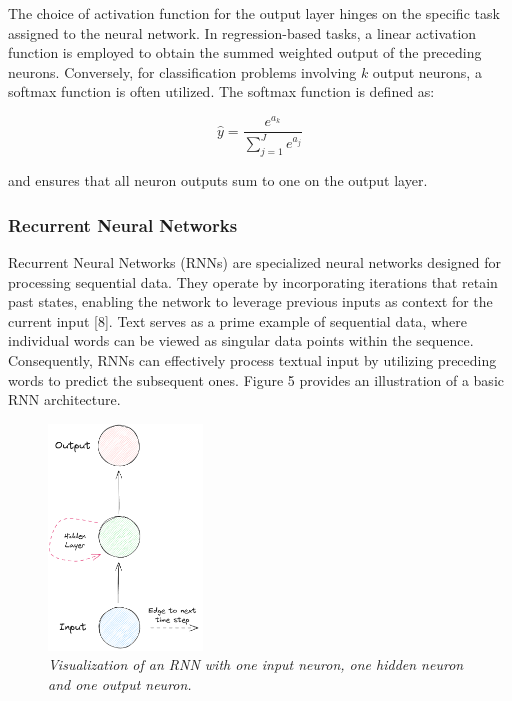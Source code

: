 The choice of activation function for the output layer hinges on the specific task assigned to the neural network. In regression-based tasks, a linear activation function is employed to obtain the summed weighted output of the preceding neurons. Conversely, for classification problems involving \(k\) output neurons, a softmax function is often utilized. The softmax function is defined as:

\begin{equation}
    \hat{y} = \frac{e^{a_k}}{\sum_{j=1}^J e^{a_j}}
\end{equation}

\noindent and ensures that all neuron outputs sum to one on the output layer.

\subsubsection*{Recurrent Neural Networks}
\label{sec:rnn}

Recurrent Neural Networks (RNNs) are specialized neural networks designed for processing sequential data. They operate by incorporating iterations that retain past states, enabling the network to leverage previous inputs as context for the current input [8]. Text serves as a prime example of sequential data, where individual words can be viewed as singular data points within the sequence. Consequently, RNNs can effectively process textual input by utilizing preceding words to predict the subsequent ones. Figure 5 provides an illustration of a basic RNN architecture.


\begin{figure}[H]
    \centering
    \includegraphics[width=\textwidth,height=6cm,keepaspectratio=true]{rnn.png}
    \caption{
        \it{Visualization of an RNN with one input neuron, one hidden neuron and
            one output neuron.}
    }
    \label{fig:rnn}
\end{figure}

